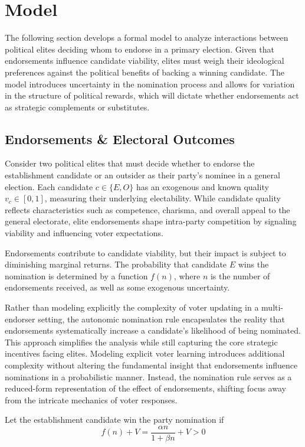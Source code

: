 \section{Model}
The following section develops a formal model to analyze interactions between political elites deciding whom to endorse in a primary election. Given that endorsements influence candidate viability, elites must weigh their ideological preferences against the political benefits of backing a winning candidate. The model introduces uncertainty in the nomination process and allows for variation in the structure of political rewards, which will dictate whether endorsements act as strategic complements or substitutes.

\subsection*{Endorsements \& Electoral Outcomes}
Consider two political elites that must decide whether to endorse the establishment candidate or an outsider as their party's nominee in a general election. Each candidate $c \in \{E, O\}$ has an exogenous and known quality $v_c \in [0,1]$, measuring their underlying electability. While candidate quality reflects characteristics such as competence, charisma, and overall appeal to the general electorate, elite endorsements shape intra-party competition by signaling viability and influencing voter expectations.

Endorsements contribute to candidate viability, but their impact is subject to diminishing marginal returns. The probability that candidate $E$ wins the nomination is determined by a function $f(n)$, where $n$ is the number of endorsements received, as well as some exogenous uncertainty. 

Rather than modeling explicitly the complexity of voter updating in a multi-endorser setting, the autonomic nomination rule encapsulates the reality that endorsements systematically increase a candidate's likelihood of being nominated. This approach simplifies the analysis while still capturing the core strategic incentives facing elites. Modeling explicit voter learning introduces additional complexity without altering the fundamental insight that endorsements influence nominations in a probabilistic manner. Instead, the nomination rule serves as a reduced-form representation of the effect of endorsements, shifting focus away from the intricate mechanics of voter responses.

Let the establishment candidate win the party nomination if
\[f(n) + V = \frac{\alpha n}{1+ \beta n} + V > 0\]

